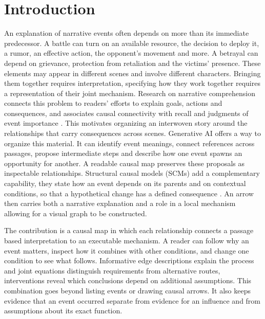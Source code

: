\documentclass{svproc}
\begin{document}
\section{Introduction}
An explanation of narrative events often depends on more than its immediate predecessor. A battle can turn on an available resource, the decision to deploy it, a rumor, an effective action, the opponent's movement and more. A betrayal can depend on grievance, protection from retaliation and the victims' presence. These elements may appear in different scenes and involve different characters. Bringing them together requires interpretation, specifying how they work together requires a representation of their joint mechanism.
Research on narrative comprehension connects this problem to readers' efforts to explain goals, actions and consequences, and associates causal connectivity with recall and judgments of event importance \cite{graesser1994,trabasso1985}. This motivates organizing an interwoven story around the relationships that carry consequences across scenes.
Generative AI offers a way to organize this material. It can identify event meanings, connect references across passages, propose intermediate steps and describe how one event spawns an opportunity for another. A readable causal map preserves these proposals as inspectable relationships. Structural causal models (SCMs) add a complementary capability, they state how an event depends on its parents and on contextual conditions, so that a hypothetical change has a defined consequence \cite{pearl2009}. An arrow then carries both a narrative explanation and a role in a local mechanism allowing for a visual graph to be constructed.

The contribution is a causal map in which each relationship connects a passage based interpretation to an executable mechanism. A reader can follow why an event matters, inspect how it combines with other conditions, and change one condition to see what follows. Informative edge descriptions explain the process and joint equations distinguish requirements from alternative routes, interventions reveal which conclusions depend on additional assumptions. This combination goes beyond listing events or drawing causal arrows. It also keeps evidence that an event occurred separate from evidence for an influence and from assumptions about its exact function.
\end{document}
